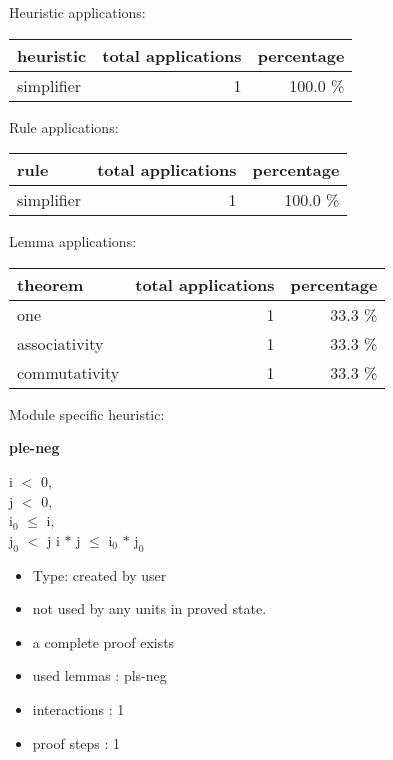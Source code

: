 \documentclass[a4paper]{article}
\begin{document}
\medskip


Heuristic applications:

\begin{supertabular}{l|r|r}
heuristic	& total applications & percentage \\ \hline
simplifier & 1 & 100.0 \% \\

\end{supertabular}

Rule applications:

\begin{supertabular}{l|r|r}
rule	        & total applications & percentage \\ \hline
simplifier & 1 & 100.0 \% \\

\end{supertabular}

Lemma applications:

\begin{supertabular}{l|r|r}
theorem	        & total applications & percentage \\ \hline
one & 1 & 33.3 \% \\
associativity & 1 & 33.3 \% \\
commutativity & 1 & 33.3 \% \\

\end{supertabular}

Module specific heuristic:

\pagebreak

{\LARGE\bf ple-neg}\label{lemma-ple-neg}

\medskip

i $<$ 0, \\
j $<$ 0, \\
$\mbox{i}_{0}$ $\le$ i, \\
$\mbox{j}_{0}$ $<$ j \Fol i $*$ j $\le$ $\mbox{i}_{0}$ $*$ $\mbox{j}_{0}$

\begin{itemize}

\item Type: created by user

\item not used by any units in proved state.
\item       a complete proof exists
\item       used lemmas  : pls-neg
\item       interactions : 1
\item       proof steps  : 1
\end{itemize}
\end{document}
